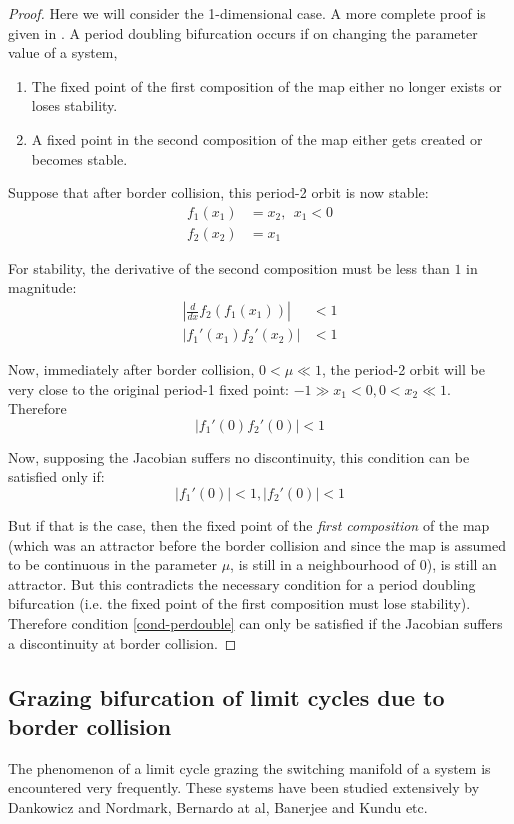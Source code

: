 \documentclass{book}
\renewcommand{\(}{\begin{columns}}
\renewcommand{\)}{\end{columns}}
\newcommand{\<}[1]{\begin{column}{#1}}
\renewcommand{\>}{\end{column}}
\begin{document}
\begin{proof}


Here we will consider the 1-dimensional case. A more complete proof is given 
in \cite{feigin-1999}.
A period doubling bifurcation occurs if on changing the parameter value of a system,
\begin{enumerate}
\item The fixed point of the first composition of the map either no longer 
exists or loses stability.  
\item A fixed point in the second composition of the map either gets created 
or becomes stable.  
\end{enumerate}

Suppose that after border collision, this period-2 orbit is now stable:
\begin{align*}
f_1(x_1)&=x_2,~~x_1<0\\
f_2(x_2)&=x_1
\end{align*}

For stability, the derivative of the second composition must be less than $1$ in magnitude:
\begin{align*}
\left|\frac{d}{dx}f_2(f_1(x_1))\right|&<1\\
\left|f_1'(x_1)f_2'(x_2)\right|&<1
\end{align*}

Now, immediately after border collision, $0<\mu\ll 1$, the period-2 orbit will be 
very close to the original period-1 fixed point: $-1\gg x_1<0, 0<x_2\ll 1$.  Therefore
\[
\left|f_1'(0)f_2'(0)\right|<1
\]

Now, supposing the Jacobian suffers no discontinuity, this condition can be 
satisfied only if:
\begin{equation}
\label{cond-perdouble}
\left|f_1'(0)\right|<1, \left|f_2'(0)\right|<1
\end{equation}


But if that is the case, then the fixed point of the \emph{first composition} 
of the map (which was an attractor before the border collision and since the 
map is assumed to be continuous in the parameter $\mu$, is still in a 
neighbourhood of $0$), is still an attractor.  But this contradicts the 
necessary condition for a period doubling bifurcation (i.e. the fixed point of 
the first composition must lose stability). Therefore condition 
\eqref{cond-perdouble} can only be satisfied if the Jacobian suffers a 
discontinuity at border collision.  
\end{proof}

\subsection{Grazing bifurcation of limit cycles due to border collision}
The phenomenon of a limit cycle grazing the switching manifold of a system is encountered 
very frequently.  These systems have been studied extensively by Dankowicz and Nordmark\cite{dankowicz-nordmark-zdm}, Bernardo at al\cite{bernardo-grazing-prl}, Banerjee and Kundu\cite{banerjee-kundu-soft} etc.
\end{document}
